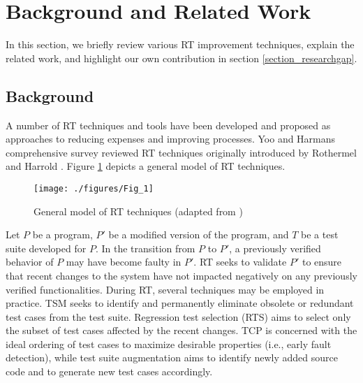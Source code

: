 \documentclass[1p]{elsarticle}
\begin{document}
\section{Background and Related Work}

In this section, we briefly review various RT improvement techniques, explain the related work, and highlight our own contribution in section \ref{section_researchgap}.

\subsection{Background}
A number of RT techniques and tools have been developed and proposed as approaches to reducing expenses and improving processes. Yoo and Harman\textsc{}s \cite{yoo2012regression} comprehensive survey reviewed RT techniques originally introduced by Rothermel and Harrold \cite{harrold1993methodology,rothermel1996analyzing,rothermel1998empirical,rothermel1999test}. Figure \ref{fig:RT_Background} depicts a general model of RT techniques. 

\begin{figure}[H]
\centering
\texttt{[image: ./figures/Fig\_1]}
\caption{General model of RT techniques (adapted from \cite{do2016chapter})} \label{fig:RT_Background}
\end{figure}

Let $P$ be a program, $P'$ be a modified version of the program, and $T$ be a test suite developed for $P$. In the transition from $P$ to $P'$, a previously verified behavior of $P$ may have become faulty in $P'$. RT seeks to validate $P'$ to ensure that recent changes to the system have not impacted negatively on any previously verified functionalities. During RT, several techniques may be employed in practice. TSM seeks to identify and permanently eliminate obsolete or redundant test cases from the test suite. Regression test selection (RTS) aims to select only the subset of test cases affected by the recent changes. TCP is concerned with the ideal ordering of test cases to maximize desirable properties (i.e., early fault detection), while test suite augmentation aims to identify newly added source code and to generate new test cases accordingly.
\end{document}
